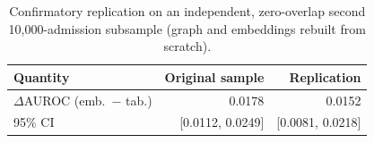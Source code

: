 \begin{table}[t]
\centering
\caption{Confirmatory replication on an independent, zero-overlap second 10{,}000-admission subsample (graph and embeddings rebuilt from scratch).}
\label{tab:replication}
\begin{tabular}{lrr}
\toprule
Quantity & Original sample & Replication \\
\midrule
$\Delta$AUROC (emb.\ $-$ tab.) & 0.0178 & 0.0152 \\
95\% CI & [0.0112, 0.0249] & [0.0081, 0.0218] \\
\bottomrule
\end{tabular}
\end{table}
